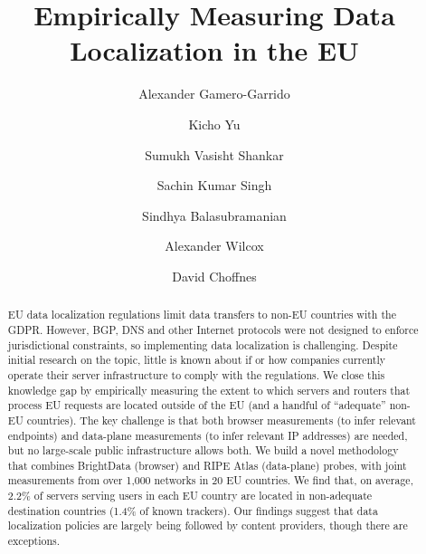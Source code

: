 \documentclass[sigconf,review,balance=false]{acmart}
\begin{document}
\author{Alexander Gamero-Garrido}

\author{Kicho Yu}

\author{Sumukh Vasisht Shankar}

\author{Sachin Kumar Singh}

\author{Sindhya Balasubramanian}

\author{Alexander Wilcox}

\author{David Choffnes}








  \title{Empirically Measuring Data Localization in the EU}



\begin{abstract}EU data localization regulations limit data transfers to non-EU countries with the GDPR. However, BGP, DNS and other Internet protocols were not designed to enforce jurisdictional constraints, so implementing data localization is challenging. 
Despite initial research on the topic, 
little is known about if or how companies currently operate their server infrastructure to comply with the regulations.
We close this knowledge gap by empirically measuring the extent 
to which servers and routers that process EU requests are located 
outside of the EU (and a handful of ``adequate'' non-EU countries). 
The key challenge is that both browser measurements (to infer relevant endpoints) 
and data-plane measurements (to infer relevant IP addresses) are needed, 
but no large-scale public infrastructure allows both. We build a novel methodology 
that combines BrightData (browser) and RIPE Atlas (data-plane) probes,
 with joint measurements from over 1,000 networks in 20 EU countries.
We find that, on average, 2.2\% of servers %
serving users in each EU country are located in non-adequate destination countries (1.4\% of known trackers). 
Our findings
suggest that data localization policies are largely being followed
by content providers, though there are %
exceptions. %
\end{abstract}
\end{document}
